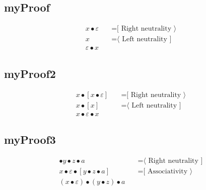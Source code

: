 \documentclass{article}
\begin{document}
\subsection{myProof}
\begin{align*}
x • ε& \quad   \text{=[ Right neutrality ⟩}\\
x& \quad   \text{=⟨ Left neutrality ]}\\
ε • x
\end{align*}
\subsection{myProof2}
\begin{align*}
x • [x • ε]& \quad   \text{=[ Right neutrality ⟩}\\
x • [x]& \quad   \text{=⟨ Left neutrality ]}\\
x • ε • x
\end{align*}
\subsection{myProof3}
\begin{align*}
[x] • y • z • a& \quad   \text{=⟨ Right neutrality ]}\\
x • ε • [y • z • a]& \quad   \text{=[ Associativity ⟩}\\
(x • ε) • (y • z) • a
\end{align*}
\end{document}
